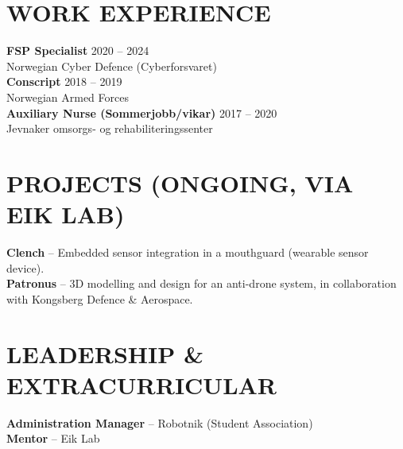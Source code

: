 \documentclass[a4paper,10pt]{article}
\begin{document}
\section{WORK EXPERIENCE}

\noindent\textbf{FSP Specialist} \hfill {\small\color{mid} 2020 -- 2024}\\
{\small Norwegian Cyber Defence (Cyberforsvaret)}\\[0.5ex]

\noindent\textbf{Conscript} \hfill {\small\color{mid} 2018 -- 2019}\\
{\small Norwegian Armed Forces}\\[0.5ex]

\noindent\textbf{Auxiliary Nurse (Sommerjobb/vikar)} \hfill {\small\color{mid} 2017 -- 2020}\\
{\small Jevnaker omsorgs- og rehabiliteringssenter}

\section{PROJECTS (ONGOING, VIA EIK LAB)}

\noindent\textbf{Clench} -- Embedded sensor integration in a mouthguard (wearable sensor device).\\[0.3ex]

\noindent\textbf{Patronus} -- 3D modelling and design for an anti-drone system, in collaboration with Kongsberg Defence \& Aerospace.

\section{LEADERSHIP \& EXTRACURRICULAR}

\noindent\textbf{Administration Manager} -- Robotnik (Student Association)\\[0.3ex]

\noindent\textbf{Mentor} -- Eik Lab
\end{document}
